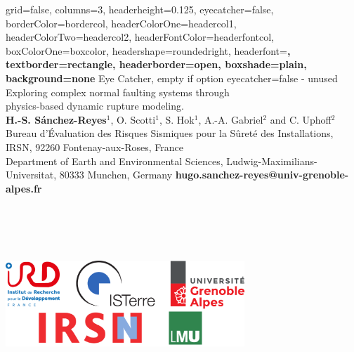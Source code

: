 


	

\color{standardfontcolor}

\begin{poster}{
		grid=false,
		columns=3,
		headerheight=0.125\textheight,
		eyecatcher=false,
        borderColor=bordercol,
		headerColorOne=headercol1,
		headerColorTwo=headercol2,
		headerFontColor=headerfontcol,
		boxColorOne=boxcolor,
		headershape=roundedright,
		headerfont=\sffamily\bfseries\Large,
		textborder=rectangle,
		headerborder=open,
		boxshade=plain,
		background=none
	}
	{
		Eye Catcher, empty if option eyecatcher=false - unused
	}
%
{
	\textsf %
	{\vskip 2.0cm Exploring complex normal faulting systems through \\ physics-based dynamic rupture modeling.}
}
{\sf\vspace{-0.1em}\\
	{\textbf{H.-S. S\'anchez-Reyes$^1$}, O. Scotti$^1$, S. Hok$^1$, A.-A. Gabriel$^2$ and C. Uphoff$^2$}
	\vspace{0.2em}\\
	\normalsize{Bureau d’Évaluation des Risques Sismiques pour la Sûreté des Installations, IRSN, 92260 Fontenay-aux-Roses, France
	\vspace{0.1em}\\
	Department of Earth and Environmental Sciences, Ludwig-Maximilians-Universitat, 80333 Munchen, Germany	 	
	\hskip 1.7cm \textbf{\normalsize \Letter} \textbf{hugo.sanchez-reyes@univ-grenoble-alpes.fr}
	} \\ \\ \\ \\ \\ 
}
{ \begin{minipage}{2cm}
  \vskip -0cm \hskip -7.3cm \includegraphics[width=9cm]{../../logos/logo_poster_2022.png}
 \end{minipage}
 }
%


\end{poster}
